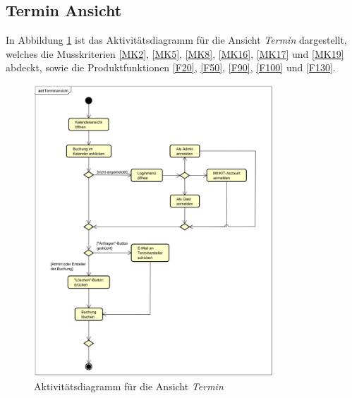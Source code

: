 \subsection{Termin Ansicht}
In Abbildung \ref{fig:activity_diagram_calendar} ist das Aktivitätsdiagramm für die Ansicht \textit{Termin} dargestellt,
welches die Musskriterien \ref{MK2}, \ref{MK5}, \ref{MK8}, \ref{MK16}, \ref{MK17} und \ref{MK19} abdeckt,
sowie die Produktfunktionen \ref{F20}, \ref{F50}, \ref{F90}, \ref{F100} und \ref{F130}.
\begin{figure}[ht]
    \centering
    \includegraphics[width=0.8\textwidth]{figures/activitydiagrams/terminansicht}
    \caption{Aktivitätsdiagramm für die Ansicht \textit{Termin}}
    \label{fig:activity_diagram_calendar}
\end{figure}
